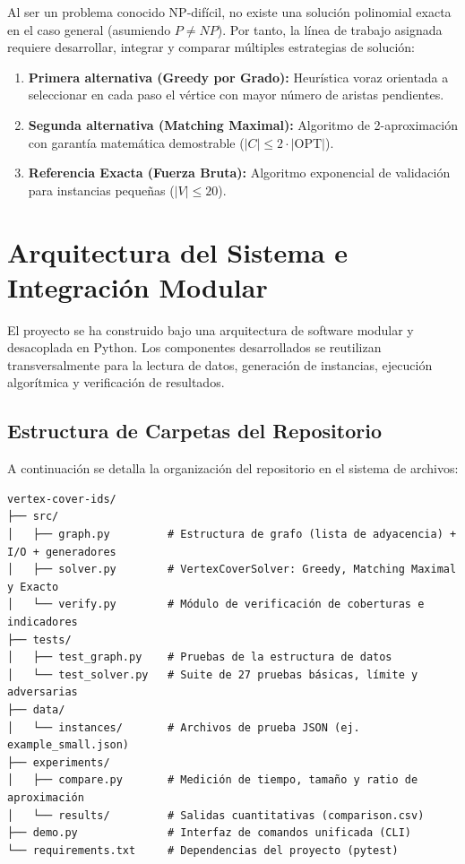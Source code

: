 \documentclass[11pt,a4paper]{article}
\begin{document}
Al ser un problema conocido NP-difícil, no existe una solución polinomial exacta en el caso general (asumiendo $P \neq NP$). Por tanto, la línea de trabajo asignada requiere desarrollar, integrar y comparar múltiples estrategias de solución:
\begin{enumerate}[leftmargin=*]
    \item \textbf{Primera alternativa (Greedy por Grado):} Heurística voraz orientada a seleccionar en cada paso el vértice con mayor número de aristas pendientes.
    \item \textbf{Segunda alternativa (Matching Maximal):} Algoritmo de 2-aproximación con garantía matemática demostrable ($|C| \le 2 \cdot |\text{OPT}|$).
    \item \textbf{Referencia Exacta (Fuerza Bruta):} Algoritmo exponencial de validación para instancias pequeñas ($|V| \le 20$).
\end{enumerate}

\section{Arquitectura del Sistema e Integración Modular}
El proyecto se ha construido bajo una arquitectura de software modular y desacoplada en Python. Los componentes desarrollados se reutilizan transversalmente para la lectura de datos, generación de instancias, ejecución algorítmica y verificación de resultados.

\subsection{Estructura de Carpetas del Repositorio}
A continuación se detalla la organización del repositorio en el sistema de archivos:

\begin{lstlisting}
vertex-cover-ids/
├── src/
│   ├── graph.py         # Estructura de grafo (lista de adyacencia) + I/O + generadores
│   ├── solver.py        # VertexCoverSolver: Greedy, Matching Maximal y Exacto
│   └── verify.py        # Módulo de verificación de coberturas e indicadores
├── tests/
│   ├── test_graph.py    # Pruebas de la estructura de datos
│   └── test_solver.py   # Suite de 27 pruebas básicas, límite y adversarias
├── data/
│   └── instances/       # Archivos de prueba JSON (ej. example_small.json)
├── experiments/
│   ├── compare.py       # Medición de tiempo, tamaño y ratio de aproximación
│   └── results/         # Salidas cuantitativas (comparison.csv)
├── demo.py              # Interfaz de comandos unificada (CLI)
└── requirements.txt     # Dependencias del proyecto (pytest)
\end{lstlisting}
\end{document}
